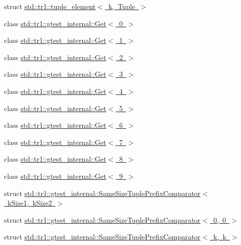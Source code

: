 \begin{DoxyCompactItemize}
\item 
struct \mbox{\hyperlink{structstd_1_1tr1_1_1tuple__element}{std\+::tr1\+::tuple\+\_\+element$<$ k, Tuple $>$}}
\item 
class \mbox{\hyperlink{classstd_1_1tr1_1_1gtest__internal_1_1Get_3_010_01_4}{std\+::tr1\+::gtest\+\_\+internal\+::\+Get$<$ 0 $>$}}
\item 
class \mbox{\hyperlink{classstd_1_1tr1_1_1gtest__internal_1_1Get_3_011_01_4}{std\+::tr1\+::gtest\+\_\+internal\+::\+Get$<$ 1 $>$}}
\item 
class \mbox{\hyperlink{classstd_1_1tr1_1_1gtest__internal_1_1Get_3_012_01_4}{std\+::tr1\+::gtest\+\_\+internal\+::\+Get$<$ 2 $>$}}
\item 
class \mbox{\hyperlink{classstd_1_1tr1_1_1gtest__internal_1_1Get_3_013_01_4}{std\+::tr1\+::gtest\+\_\+internal\+::\+Get$<$ 3 $>$}}
\item 
class \mbox{\hyperlink{classstd_1_1tr1_1_1gtest__internal_1_1Get_3_014_01_4}{std\+::tr1\+::gtest\+\_\+internal\+::\+Get$<$ 4 $>$}}
\item 
class \mbox{\hyperlink{classstd_1_1tr1_1_1gtest__internal_1_1Get_3_015_01_4}{std\+::tr1\+::gtest\+\_\+internal\+::\+Get$<$ 5 $>$}}
\item 
class \mbox{\hyperlink{classstd_1_1tr1_1_1gtest__internal_1_1Get_3_016_01_4}{std\+::tr1\+::gtest\+\_\+internal\+::\+Get$<$ 6 $>$}}
\item 
class \mbox{\hyperlink{classstd_1_1tr1_1_1gtest__internal_1_1Get_3_017_01_4}{std\+::tr1\+::gtest\+\_\+internal\+::\+Get$<$ 7 $>$}}
\item 
class \mbox{\hyperlink{classstd_1_1tr1_1_1gtest__internal_1_1Get_3_018_01_4}{std\+::tr1\+::gtest\+\_\+internal\+::\+Get$<$ 8 $>$}}
\item 
class \mbox{\hyperlink{classstd_1_1tr1_1_1gtest__internal_1_1Get_3_019_01_4}{std\+::tr1\+::gtest\+\_\+internal\+::\+Get$<$ 9 $>$}}
\item 
struct \mbox{\hyperlink{structstd_1_1tr1_1_1gtest__internal_1_1SameSizeTuplePrefixComparator}{std\+::tr1\+::gtest\+\_\+internal\+::\+Same\+Size\+Tuple\+Prefix\+Comparator$<$ k\+Size1, k\+Size2 $>$}}
\item 
struct \mbox{\hyperlink{structstd_1_1tr1_1_1gtest__internal_1_1SameSizeTuplePrefixComparator_3_010_00_010_01_4}{std\+::tr1\+::gtest\+\_\+internal\+::\+Same\+Size\+Tuple\+Prefix\+Comparator$<$ 0, 0 $>$}}
\item 
struct \mbox{\hyperlink{structstd_1_1tr1_1_1gtest__internal_1_1SameSizeTuplePrefixComparator_3_01k_00_01k_01_4}{std\+::tr1\+::gtest\+\_\+internal\+::\+Same\+Size\+Tuple\+Prefix\+Comparator$<$ k, k $>$}}
\end{DoxyCompactItemize}
